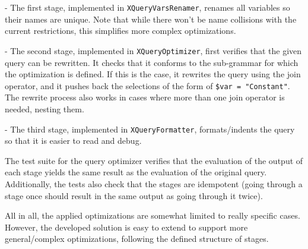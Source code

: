 \documentclass[paper=letter, fontsize=11pt]{scrartcl}
\begin{document}
- The first stage, implemented in \texttt{XQueryVarsRenamer}, renames all variables so their names are unique.
Note that while there won't be name collisions with the current restrictions, this simplifies more complex optimizations.

- The second stage, implemented in \texttt{XQueryOptimizer}, first verifies that the given query can be rewritten.
It checks that it conforms to the sub-grammar for which the optimization is defined.
If this is the case, it rewrites the query using the join operator, and it pushes back the selections of the form of \texttt{\$var~=~"Constant"}.
The rewrite process also works in cases where more than one join operator is needed, nesting them.

- The third stage, implemented in \texttt{XQueryFormatter}, formats/indents the query so that it is easier to read and debug.

The test suite for the query optimizer verifies that the evaluation of the output of each stage yields the same result as the evaluation of the original query.
Additionally, the tests also check that the stages are idempotent (going through a stage once should result in the same output as going through it twice).

All in all, the applied optimizations are somewhat limited to really specific cases.
However, the developed solution is easy to extend to support more general/complex optimizations, following the defined structure of stages.
\end{document}
